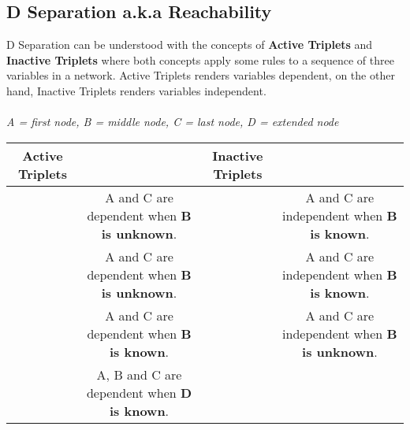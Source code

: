 \documentclass[12pt]{article}
\begin{document}
\subsection*{D Separation a.k.a Reachability}
D Separation can be understood with the concepts of \textbf{Active Triplets} and \textbf{Inactive Triplets} where both concepts apply some rules to a sequence of three variables in a network. Active Triplets renders variables dependent, on the other hand, Inactive Triplets renders variables independent.\\\\
\textit{A = first node, B = middle node, C = last node, D = extended node}
\center
\begin{tabular}{|c|c|c|c|}
\hline
Active Triplets 
&
&
Inactive Triplets
& \\ \hline
\raisebox{-\totalheight}{\texttt{[image: probs11]}} 
& 
\parbox[c]{0.25\textwidth}{A and C are dependent when \textbf{B is unknown}.}
&  
& \parbox[c]{0.25\textwidth}{A and C are independent when \textbf{B is known}.}\\[5em] \hline
& 
\parbox[c]{0.25\textwidth}{A and C are dependent when \textbf{B is unknown}.}
&  
& \parbox[c]{0.25\textwidth}{A and C are independent when \textbf{B is known}.}\\[5em] \hline
& 
\parbox[c]{0.25\textwidth}{A and C are dependent when \textbf{B is known}.}
&  
& \parbox[c]{0.25\textwidth}{A and C are independent when \textbf{B is unknown}.}\\[5em] \hline
& 
\parbox[c]{0.25\textwidth}{A, B and C are dependent when \textbf{D is known}.}
& &
\end{tabular}
\center
\end{document}

